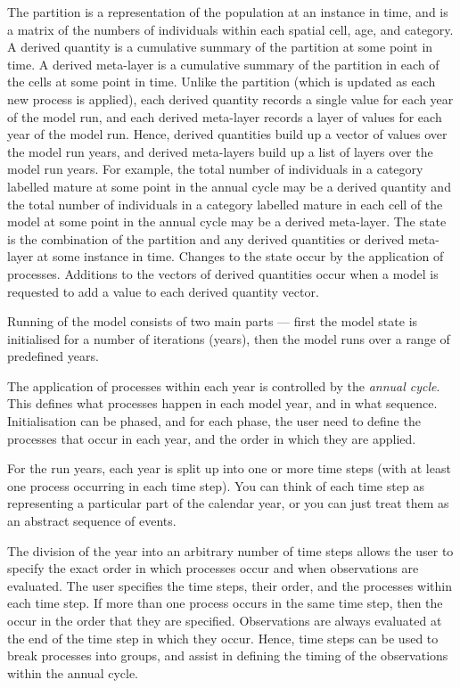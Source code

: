 The partition is a representation of the population at an instance in time, and is a matrix of the numbers of individuals within each spatial cell, age, and category. A derived quantity is a cumulative summary of the partition at some point in time. A derived meta-layer is a cumulative summary of the partition in each of the cells at some point in time. Unlike the partition (which is updated as each new process is applied), each derived quantity records a single value for each year of the model run, and each derived meta-layer records a layer of values for each year of the model run. Hence, derived quantities build up a vector of values over the model run years, and derived meta-layers build up a list of layers over the model run years. For example, the total number of individuals in a category labelled mature at some point in the annual cycle may be a derived quantity and the total number of individuals in a category labelled mature in each cell of the model at some point in the annual cycle may be a derived meta-layer. The state is the combination of the partition and any derived quantities or derived meta-layer at some instance in time. Changes to the state occur by the application of processes. Additions to the vectors of derived quantities occur when a model is requested to add a value to each derived quantity vector. 

Running of the model consists of two main parts --- first the model state is initialised for a number of iterations (years), then the model runs over a range of predefined years. 

The application of processes within each year is controlled by the \emph{annual cycle}. This defines what processes happen in each model year, and in what sequence. Initialisation can be phased, and for each phase, the user need to define the processes that occur in each year, and the order in which they are applied. 

For the run years, each year is split up into one or more time steps (with at least one process occurring in each time step). You can think of each time step as representing a particular part of the calendar year, or you can just treat them as an abstract sequence of events.

The division of the year into an arbitrary number of time steps allows the user to specify the exact order in which processes occur and when observations are evaluated. The user specifies the time steps, their order, and the processes within each time step. If more than one process occurs in the same time step, then the occur in the order that they are specified. Observations are always evaluated at the end of the time step in which they occur. Hence, time steps can be used to break processes into groups, and assist in defining the timing of the observations within the annual cycle. 

